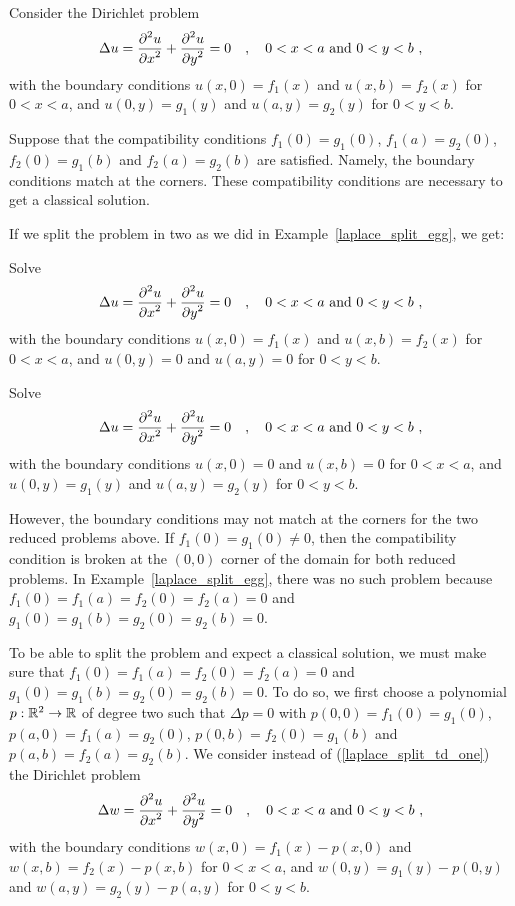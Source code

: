 \begin{rmk}
Consider the Dirichlet problem
\begin{equation} \label{laplace_split_td_one}
\Delta u = \pdydxn{u}{x}{2} + \pdydxn{u}{y}{2} = 0
\quad , \quad 0 < x < a \ \text{and} \ 0 < y < b \ ,
\end{equation}
with the boundary conditions $u(x,0) = f_1(x)$ and $u(x,b) = f_2(x)$
for $0<x<a$, and $u(0,y) = g_1(y)$ and $u(a,y) = g_2(y)$ for $0<y<b$.

Suppose that the compatibility conditions $f_1(0) = g_1(0)$, $f_1(a) =
g_2(0)$, $f_2(0) = g_1(b)$ and $f_2(a) = g_2(b)$ are satisfied.
Namely, the boundary conditions match at the corners.  These
compatibility conditions are necessary to get a classical solution.

If we split the problem in two as we did in
Example~\ref{laplace_split_egg}, we get:

Solve
\[
\Delta u = \pdydxn{u}{x}{2} + \pdydxn{u}{y}{2} = 0
\quad , \quad 0 < x < a \ \text{and} \ 0 < y < b \ ,
\]
with the boundary conditions $u(x,0) = f_1(x)$ and
$u(x,b) = f_2(x)$ for $0<x<a$, and 
$u(0,y) = 0$ and $u(a,y) = 0$ for $0<y<b$.

Solve
\[
\Delta u = \pdydxn{u}{x}{2} + \pdydxn{u}{y}{2} = 0
\quad , \quad 0 < x < a \ \text{and} \ 0 < y < b \ ,
\]
with the boundary conditions
$u(x,0) = 0$ and $u(x,b) = 0$ for $0<x<a$, and
$u(0,y) = g_1(y)$ and $u(a,y) = g_2(y)$ for $0<y<b$.

However, the boundary conditions may not match at the corners for the
two reduced problems above.  If $f_1(0) = g_1(0) \neq 0$, then the
compatibility condition is broken at the $(0,0)$ corner of the domain
for both reduced problems.  In Example~\ref{laplace_split_egg},
there was no such problem because $f_1(0) = f_1(a) = f_2(0) = f_2(a) = 0$
and $g_1(0) = g_1(b) = g_2(0) = g_2(b) = 0$.

To be able to split the problem and expect a classical solution, we
must make sure that $f_1(0) = f_1(a) = f_2(0) = f_2(a) = 0$ and
$g_1(0) = g_1(b) = g_2(0) = g_2(b) = 0$.  To do so, we first choose a
polynomial $p:\mathbb{R}^2\to \mathbb{R}$ of degree two such that
$\Delta p = 0$ with
$p(0,0) = f_1(0) = g_1(0)$, $p(a,0) = f_1(a) = g_2(0)$,
$p(0,b) = f_2(0) = g_1(b)$ and $p(a,b) = f_2(a) = g_2(b)$.
We consider instead of (\ref{laplace_split_td_one}) the Dirichlet
problem
\[
\Delta w = \frac{\displaystyle \partial^{2}{u}} {\displaystyle \partial x^{2}} + \frac{\displaystyle \partial^{2}{u}} {\displaystyle \partial y^{2}} = 0 \quad ,
\quad 0 < x < a \ \text{and} \ 0 < y < b \ ,
\]
with the boundary conditions
$w(x,0) = f_1(x) - p(x,0)$ and $w(x,b) = f_2(x) - p(x,b)$
for $0<x<a$, and $w(0,y) = g_1(y) - p(0,y)$ and
$w(a,y) = g_2(y) - p(a,y)$ for $0<y<b$.


\end{rmk}
